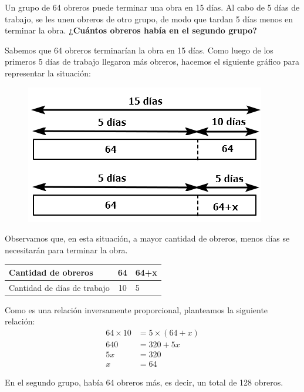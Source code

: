 \question[10] Un grupo de 64 obreros puede terminar una obra en 15 días. Al cabo de 5 días de trabajo, se les unen obreros de otro grupo, de modo que tardan 5 días menos en terminar la obra.
\textbf{¿Cuántos obreros había en el segundo grupo?}

\begin{solutionbox}{9cm}
    Sabemos que 64 obreros terminarían la obra en 15 días. Como luego de los primeros 5 días de trabajo llegaron más obreros, hacemos el siguiente gráfico para representar la situación:

    \begin{minipage}{.35\textwidth}
        \begin{figure}[H]
            \centering
            \includegraphics[width=\linewidth]{../images/tableS8L103}
        \end{figure}
    \end{minipage}\hfill
    \begin{minipage}{.55\textwidth}
        Observamos que, en esta situación, a mayor cantidad de obreros, menos días se necesitarán para terminar la obra.
        \begin{table}[H]
            \centering
            \begin{tabular}{|l|c|l|}
                \hline
                Cantidad de obreros         & 64 & 64+x \\
                \hline
                Cantidad de días de trabajo & 10 & 5    \\
                \hline
            \end{tabular}
        \end{table}
        Como es una relación inversamente proporcional, planteamos la siguiente relación:
        \begin{align*}
            64 \times 10 & = 5 \times (64+x) \\
            640          & = 320 +5x         \\
            5x           & = 320             \\
            x            & = 64
        \end{align*}
    \end{minipage}

    En el segundo grupo, había 64 obreros más, es decir, un total de 128 obreros.
\end{solutionbox}